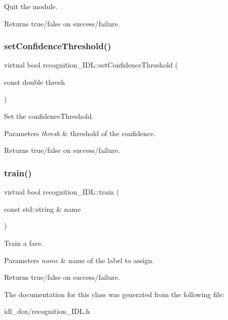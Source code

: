 Quit the module. 

\begin{DoxyReturn}{Returns}
true/false on success/failure. 
\end{DoxyReturn}
\mbox{\label{classrecognition__IDL_ab4ab3c0a86b630b85e411ff39720fc3d}} 
\subsubsection{\texorpdfstring{set\+Confidence\+Threshold()}{setConfidenceThreshold()}}
{\footnotesize\ttfamily virtual bool recognition\+\_\+\+I\+D\+L\+::set\+Confidence\+Threshold (\begin{DoxyParamCaption}\item[{const double}]{thresh }\end{DoxyParamCaption})\hspace{0.3cm}{\ttfamily [virtual]}}



Set the confidence\+Threshold. 


\begin{DoxyParams}{Parameters}
{\em thresh} & threshold of the confidence. \\
\hline
\end{DoxyParams}
\begin{DoxyReturn}{Returns}
true/false on success/failure. 
\end{DoxyReturn}
\mbox{\label{classrecognition__IDL_acf63e73eba86bdffa4620aa4240ed17f}} 
\subsubsection{\texorpdfstring{train()}{train()}}
{\footnotesize\ttfamily virtual bool recognition\+\_\+\+I\+D\+L\+::train (\begin{DoxyParamCaption}\item[{const std\+::string \&}]{name }\end{DoxyParamCaption})\hspace{0.3cm}{\ttfamily [virtual]}}



Train a face. 


\begin{DoxyParams}{Parameters}
{\em name} & name of the label to assign. \\
\hline
\end{DoxyParams}
\begin{DoxyReturn}{Returns}
true/false on success/failure. 
\end{DoxyReturn}


The documentation for this class was generated from the following file\+:\begin{DoxyCompactItemize}
\item 
idl\+\_\+dox/recognition\+\_\+\+I\+D\+L.\+h\end{DoxyCompactItemize}

